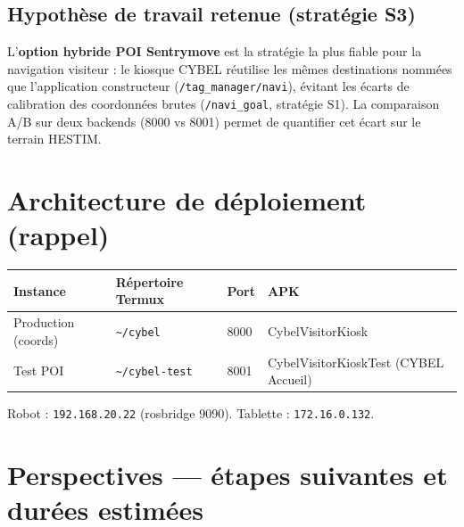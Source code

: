 \documentclass[11pt,a4paper]{article}
\begin{document}
\subsection{Hypothèse de travail retenue (stratégie S3)}

L'\textbf{option hybride POI Sentrymove} est la stratégie la plus fiable pour la navigation visiteur : le kiosque CYBEL réutilise les mêmes destinations nommées que l'application constructeur (\texttt{/tag\_manager/navi}), évitant les écarts de calibration des coordonnées brutes (\texttt{/navi\_goal}, stratégie S1). La comparaison A/B sur deux backends (8000 vs 8001) permet de quantifier cet écart sur le terrain HESTIM.

\section{Architecture de déploiement (rappel)}

\begin{center}
\begin{tabular}{@{}llll@{}}
\toprule
\textbf{Instance} & \textbf{Répertoire Termux} & \textbf{Port} & \textbf{APK} \\
\midrule
Production (coords) & \texttt{\textasciitilde/cybel} & 8000 & CybelVisitorKiosk \\
Test POI & \texttt{\textasciitilde/cybel-test} & 8001 & CybelVisitorKioskTest (CYBEL Accueil) \\
\bottomrule
\end{tabular}
\end{center}

Robot : \texttt{192.168.20.22} (rosbridge 9090). Tablette : \texttt{172.16.0.132}.

\section{Perspectives — étapes suivantes et durées estimées}
\end{document}
